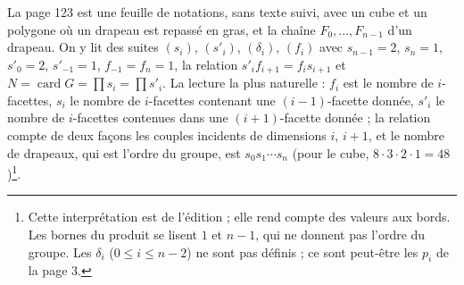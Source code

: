 \documentclass[11pt,a4paper]{article}
\begin{document}
La page 123 est une feuille de notations, sans texte suivi, avec un cube et un
polygone où un drapeau est repassé en gras, et la chaîne $F_0, \dots, F_{n-1}$
d'un drapeau. On y lit des suites $(s_i)$, $(s'_i)$, $(\delta_i)$, $(f_i)$ avec
$s_{n-1} = 2$, $s_n = 1$, $s'_0 = 2$, $s'_{-1} = 1$, $f_{-1} = f_n = 1$, la
relation $s'_i f_{i+1} = f_i s_{i+1}$ et $N = \operatorname{card} G = \prod s_i =
\prod s'_i$. La lecture la plus naturelle : $f_i$ est le nombre de
$i$-facettes, $s_i$ le nombre de $i$-facettes contenant une $(i-1)$-facette
donnée, $s'_i$ le nombre de $i$-facettes contenues dans une $(i+1)$-facette
donnée ; la relation compte de deux façons les couples incidents de dimensions
$i$, $i+1$, et le nombre de drapeaux, qui est l'ordre du groupe, est
$s_0 s_1 \cdots s_n$ (pour le cube, $8 \cdot 3 \cdot 2 \cdot 1 = 48$)\footnote{Cette
interprétation est de l'édition ; elle rend compte des valeurs aux bords. Les
bornes du produit se lisent $1$ et $n - 1$, qui ne donnent pas l'ordre du
groupe. Les $\delta_i$ ($0 \leq i \leq n - 2$) ne sont pas définis ; ce sont
peut-être les $p_i$ de la page 3.}.
\end{document}
